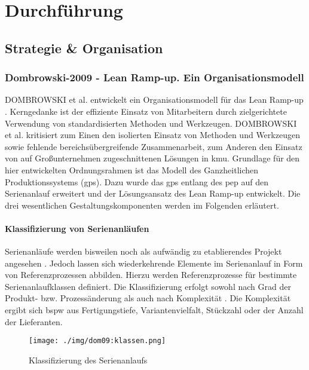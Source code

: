 
\chapter{Durchführung}\label{sec:durchfuehrung}

\section{Strategie \& Organisation}

\subsection*{Dombrowski-2009 - Lean Ramp-up. Ein Organisationsmodell}\label{dom09}

DOMBROWSKI et al. entwickelt ein Organisationsmodell für das Lean Ramp-up \cite{Dombrowski2009}. Kerngedanke ist der effiziente Einsatz von Mitarbeitern durch zielgerichtete Verwendung von standardisierten Methoden und Werkzeugen. DOMBROWSKI et al. kritisiert zum Einen den isolierten Einsatz von Methoden und Werkzeugen sowie fehlende bereichsübergreifende Zusammenarbeit, zum Anderen den Einsatz von auf Großunternehmen zugeschnittenen Lösungen in \gls{kmu}. 
Grundlage für den hier entwickelten Ordnungsrahmen ist das Modell des Ganzheitlichen Produktionssystems (\gls{gps}). Dazu wurde das \gls{gps} entlang des \gls{pep} auf den Serienanlauf erweitert und der Lösungsansatz des Lean Ramp-up entwickelt. Die drei wesentlichen Gestaltungskomponenten werden im Folgenden erläutert. 

\subsubsection{Klassifizierung von Serienanläufen}
Serienanläufe werden bisweilen noch als aufwändig zu etablierendes Projekt angesehen \cite{Kuhn2002}. Jedoch lassen sich wiederkehrende Elemente im Serienanlauf in Form von Referenzprozessen abbilden. Hierzu werden Referenzprozesse für bestimmte Serienanlaufklassen definiert. Die Klassifizierung erfolgt sowohl nach Grad der Produkt- bzw. Prozessänderung \cite{Kuhn2002} als auch nach Komplexität%
.
Die Komplexität ergibt sich \gls{bspw} aus Fertigungstiefe, Variantenvielfalt, Stückzahl oder der Anzahl der Lieferanten.

\begin{figure}[ht]
 \centering
 \texttt{[image: ./img/dom09:klassen.png]}
 \caption{Klassifizierung des Serienanlaufs \cite{Dombrowski2009}}
 \label{fig:anlaufklassen}
\end{figure}

